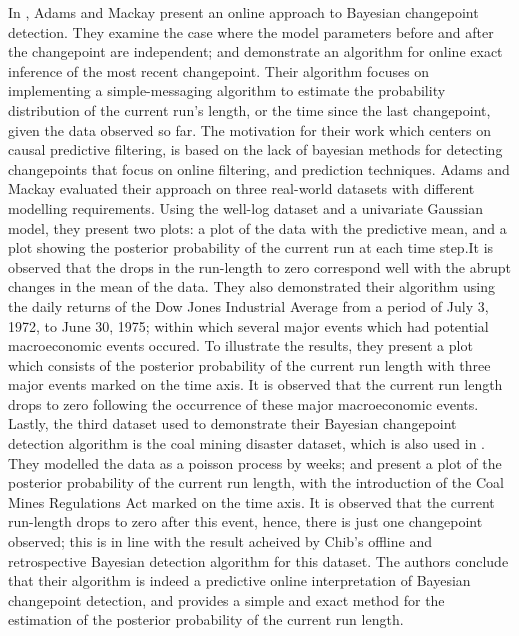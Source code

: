 \documentclass[13pt]{report}
\begin{document}
In \cite{adams2007bayesian}, Adams and Mackay present an online approach to Bayesian changepoint detection. They examine the case  where the model parameters before and after the changepoint are independent; and demonstrate an algorithm for online exact inference of the most recent changepoint. Their algorithm focuses on implementing a simple-messaging algorithm to estimate the probability distribution of the current run's length, or the time since the last changepoint, given the data observed so far\cite{adams2007bayesian}. The motivation for their work which centers on causal predictive filtering, is based on the lack of bayesian methods for detecting changepoints that focus on online filtering, and prediction techniques. Adams and Mackay evaluated their approach on three real-world datasets with different modelling requirements. Using the well-log dataset and a univariate Gaussian model, they present two plots: a plot of the data with the predictive mean, and a plot showing the posterior probability of the current run at each time step.It is observed that the drops in the run-length to zero correspond well with the abrupt changes in the mean of the data\cite{adams2007bayesian}. They also demonstrated their algorithm using the daily returns of the Dow Jones Industrial Average from a period of July 3, 1972, to June 30, 1975; within which several major events which had potential macroeconomic events occured. To illustrate the results, they present a plot which consists of the posterior probability of the current run length with three major events marked on the time axis. It is observed that the current run length drops to zero following the occurrence of these major macroeconomic events\cite{adams2007bayesian}. Lastly, the third dataset used to demonstrate their Bayesian changepoint detection algorithm is the coal mining disaster dataset, which is also used in \cite{chib1998estimation,fearnhead2006exact}. They modelled the data as a poisson process by weeks; and present a plot of the posterior probability of the current run length, with the introduction of the Coal Mines Regulations Act marked on the time axis. It is observed that the current run-length drops to zero after this event\cite{adams2007bayesian}, hence, there is just one changepoint observed; this is in line with the result acheived by Chib's offline and retrospective Bayesian detection algorithm for this dataset\cite{chib1998estimation}. The authors conclude that their algorithm is indeed a predictive online interpretation of Bayesian changepoint detection, and provides a simple and exact method for the estimation of the posterior probability of the current run length\cite{adams2007bayesian}.
\end{document}

